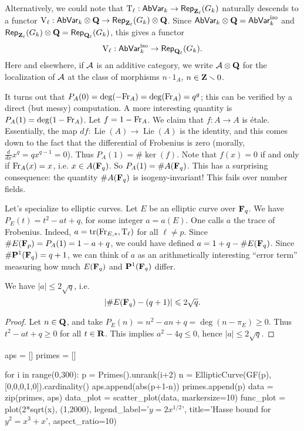 Alternatively, we could note that 
$\mathrm{T}_\ell:\mathsf{AbVar}_k\to \mathsf{Rep}_{\mathbf{Z}_\ell}(G_k)$ naturally descends to 
a functor 
$\mathrm{V}_\ell:\mathsf{AbVar}_k\otimes\mathbf{Q}\to \mathsf{Rep}_{\mathbf{Z}_\ell}(G_k)\otimes\mathbf{Q}$. 
Since $\mathsf{AbVar}_k\otimes\mathbf{Q}=\mathsf{AbVar}_k^\text{iso}$ and 
$\mathsf{Rep}_{\mathbf{Z}_\ell}(G_k)\otimes\mathbf{Q}=\mathsf{Rep}_{\mathbf{Q}_\ell}(G_k)$, this 
gives a functor 
\[
  \mathrm{V}_\ell:\mathsf{AbVar}_k^\text{iso} \to \mathsf{Rep}_{\mathbf{Q}_\ell}(G_k) \text{.}
\]
Here and elsewhere, if $\mathcal{A}$ is an additive category, we write 
$\mathcal{A}\otimes\mathbf{Q}$ for the localization of $\mathcal{A}$ at the class of morphisms 
$n\cdot 1_A$, $n\in \mathbf{Z}\smallsetminus 0$.

It turns out that $P_A(0)=\deg(-\mathrm{Fr}_A)=\deg(\mathrm{Fr}_A)=q^g$; this can be verified 
by a direct (but messy) computation. A more interesting quantity is 
$P_A(1)=\deg(1-\mathrm{Fr}_A)$. Let $f=1-\mathrm{Fr}_A$. We claim that $f:A\to A$ is \'etale. 
Essentially, the map $d f:\operatorname{Lie}(A) \to \operatorname{Lie}(A)$ is 
the identity, and this comes down to the fact that the differential of 
Frobenius is zero (morally, $\frac{d}{dx}x^q=q x^{q-1}=0$). Thus 
$P_A(1)=\# \ker(f)$. Note that $f(x)=0$ if and only if $\mathrm{Fr}_A(x)=x$, i.e. 
$x\in A(\mathbf{F}_q)$. So $P_A(1)=\#A(\mathbf{F}_q)$. This has a surprising consequence: the 
quantity $\# A(\mathbf{F}_q)$ is isogeny-invariant! This fails over number fields. 

Let's specialize to elliptic curves. Let $E$ be an elliptic curve over 
$\mathbf{F}_q$. We have $P_E(t)=t^2-a t+q$, for some integer $a=a(E)$. One calls $a$ 
the trace of Frobenius. Indeed, $a=\operatorname{tr}(\mathrm{Fr}_{E,\ast},\mathrm{T}_\ell)$ for 
all $\ell\ne p$. Since $\# E(\mathbf{F}_p)=P_A(1)=1-a+q$, we could have defined 
$a=1+q-\# E(\mathbf{F}_q)$. Since $\# \mathbf{P}^1(\mathbf{F}_q)=q+1$, we can think of $a$ as an 
arithmetically interesting ``error term'' measuring how much $E(\mathbf{F}_q)$ and 
$\mathbf{P}^1(\mathbf{F}_q)$ differ. 

\begin{theorem}
We have $|a| \leqslant 2\sqrt q$, i.e. 
\[
  | \# E(\mathbf{F}_q) - (q+1)| \leqslant 2\sqrt q \text{.}
\]
\end{theorem}
\begin{proof}
Let $n\in\mathbf{Q}$, and take $P_E(n)=n^2-a n+q = \deg(n-\pi_E)\geqslant 0$. Thus 
$t^2-a t+q\geqslant 0$ for all $t\in \mathbf{R}$. This implies $a^2-4 q\leqslant 0$, 
hence $|a|\leqslant 2\sqrt q$. 
\end{proof}

\begin{sagesilent}
  aps = []
  primes = []

  for i in range(0,300):
      p = Primes().unrank(i+2)
      n = EllipticCurve(GF(p),[0,0,0,1,0]).cardinality()
      aps.append(abs(p+1-n))
      primes.append(p)
  data = zip(primes, aps)
  data_plot = scatter_plot(data, markersize=10)
  func_plot = plot(2*sqrt(x), (1,2000), legend_label='$y=2x^{1/2}$', title='Hasse bound for $y^2=x^3+x$', aspect_ratio=10)
\end{sagesilent}


